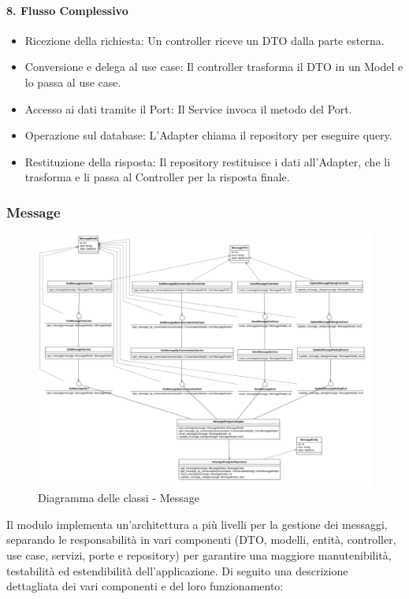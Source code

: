     \paragraph{8. Flusso Complessivo}
    \begin{itemize}
        \item Ricezione della richiesta: Un controller riceve un DTO dalla parte esterna.
        \item Conversione e delega al use case: Il controller trasforma il DTO in un Model e lo passa al use case.
        \item Accesso ai dati tramite il Port: Il Service invoca il metodo del Port.
        \item Operazione sul database: L'Adapter chiama il repository per eseguire query.
        \item Restituzione della risposta: Il repository restituisce i dati all'Adapter, che li trasforma e li passa al Controller per la risposta finale.
    \end{itemize}

    \subsubsection{Message}
    \begin{figure}[H]
        \centering
        \includegraphics[width=\linewidth, height=0.8\textheight, keepaspectratio]{./img/png/Model4!Message_4.png}
        \caption{Diagramma delle classi - Message}
        \label{fig:message}
    \end{figure}

    Il modulo implementa un'architettura a più livelli per la gestione dei messaggi, separando le responsabilità in vari componenti (DTO, modelli, entità, controller, use case, servizi, porte e repository) per garantire una maggiore manutenibilità, testabilità ed estendibilità dell’applicazione. Di seguito una descrizione dettagliata dei vari componenti e del loro funzionamento:

